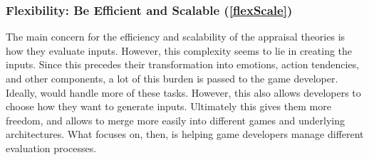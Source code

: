 \subsubsection{Flexibility: Be Efficient and Scalable (\ref{flexScale})}
The main concern for the efficiency and scalability of the appraisal theories
is how they evaluate inputs. However, this complexity seems to lie in creating
the inputs. Since this precedes their transformation into emotions, action
tendencies, and other components, a lot of this burden is passed to the game
developer. Ideally, \progname{} would handle more of these tasks. However, this
also allows developers to choose how they want to generate inputs. Ultimately
this gives them more freedom, and allows \progname{} to merge more easily into
different games and underlying architectures. What \progname{} focuses on,
then, is helping game developers manage different evaluation processes.

